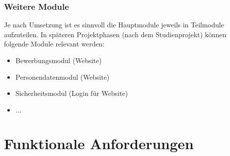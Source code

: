 \documentclass[a4paper]{scrartcl}
\begin{document}
	\subsubsection{Weitere Module}
	Je nach Umsetzung ist es sinnvoll die Hauptmodule jeweils in Teilmodule aufzuteilen. In späteren Projektphasen (nach dem Studienprojekt) können folgende Module relevant werden:
	
	\begin{itemize}
		\item Bewerbungsmodul (Website)
		\item Personendatenmodul (Website)
		\item Sicherheitsmodul (Login für Website)
		\item ...
	\end{itemize}

\pagebreak
\eject

\section{Funktionale Anforderungen}
	
\end{document}

